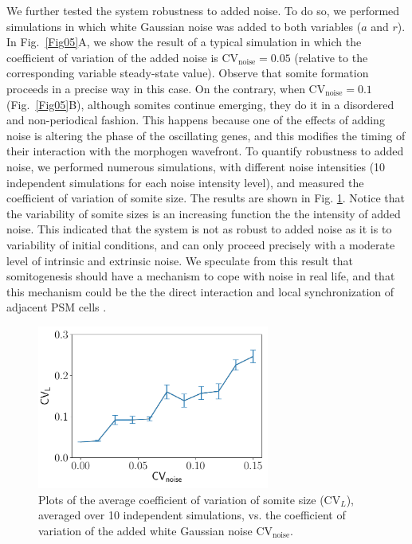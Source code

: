 \documentclass[%
 preprint,
 aip, 
 amsmath,amssymb,
]{revtex4-2}
\begin{document}
We further tested the system robustness to added noise. To do so, we performed simulations in which white Gaussian noise was added to both variables ($a$ and $r$). In Fig.~\ref{Fig05}A, we show the result of a typical simulation in which the coefficient of variation of the added noise is $\text{CV}_{\text{noise}}= 0.05$ (relative to the corresponding variable steady-state value). Observe that somite formation proceeds in a precise way in this case. On the contrary, when $\text{CV}_{\text{noise}} = 0.1$ (Fig.~\ref{Fig05}B), although somites continue emerging, they do it in a disordered and non-periodical fashion. This happens because one of the effects of adding noise is altering the phase of the oscillating genes, and this modifies the timing of their interaction with the morphogen wavefront. To quantify robustness to added noise, we performed numerous simulations, with different noise intensities (10 independent simulations for each noise intensity level), and measured the coefficient of variation of somite size. The results are shown in Fig. \ref{Fig06_2}. Notice that the variability of somite sizes is an increasing function the the intensity of added noise. This indicated that the system is not as robust to added noise as it is to variability of initial conditions, and can only proceed precisely with a moderate level of intrinsic and extrinsic noise. We speculate from this result that somitogenesis should have a mechanism to cope with noise in real life, and that this mechanism could be the the direct interaction and local synchronization of adjacent PSM cells \cite{PantojaHernndez2021}.

\begin{figure}
	\centering
	\includegraphics[width=3in]{Fig08}
	\caption{Plots of the average coefficient of variation of somite size ($\text{CV}_L$), averaged over 10 independent simulations, vs. the coefficient of variation of the added white Gaussian noise $\text{CV}_{\text{noise}}$.}
	\label{Fig06_2}
\end{figure}
\end{document}
